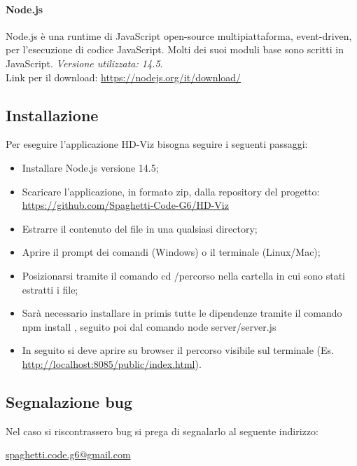 \documentclass[../manuale_utente.tex]{subfiles}
\begin{document}
\paragraph{Node.js}
    \label{par:node}
Node.js è una runtime di JavaScript open-source multipiattaforma, event-driven, per l’esecuzione di codice JavaScript. Molti dei suoi moduli base sono scritti in JavaScript. 
\emph{Versione utilizzata: 14.5}.\\
Link per il download: \url{https://nodejs.org/it/download/}

\subsection{Installazione}
    \label{sub:inst}


Per eseguire l’applicazione HD-Viz bisogna seguire i seguenti passaggi:
\begin{itemize}
    \item Installare Node.js versione 14.5;
    \item Scaricare l’applicazione, in formato zip, dalla repository del progetto: \url{https://github.com/Spaghetti-Code-G6/HD-Viz}
    \item Estrarre il contenuto del file in una qualsiasi directory; 
    \item Aprire il prompt dei comandi (Windows) o il terminale (Linux/Mac); 
    \item Posizionarsi tramite il comando cd /percorso nella cartella in cui sono stati estratti i file;
    \item Sarà necessario installare in primis tutte le dipendenze tramite il comando npm install , seguito poi dal comando node server/server.js
    \item In seguito si deve aprire su browser il percorso visibile sul terminale (Es. \url{http://localhost:8085/public/index.html}).
\end{itemize}


\subsection{Segnalazione bug}
Nel caso si riscontrassero bug si prega di segnalarlo al seguente indirizzo:\\
\begin{center}\href{mailto:spaghetti.code.g6@gmail.com}{spaghetti.code.g6@gmail.com}\end{center}
\end{document}
